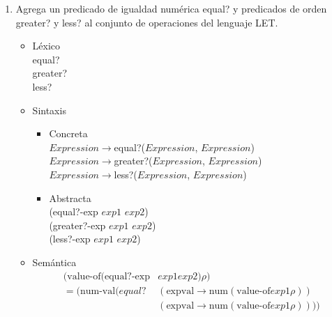 \documentclass{article}
\begin{document}
\begin{enumerate}
\begin{itemize}
        \begin{align*}
            (\text{value-of}(\text{mult-exp}& exp1 exp2) \rho ) \\
            =(\text{num-val} (* &(\text{expval} \to \text{num} (\text{value-of} exp1 \rho))\\
            &(\text{expval} \to \text{num} ( \text{value-of} exp1 \rho))))
        \end{align*}
        
        \begin{align*}
            (\text{value-of}(\text{div-exp}& exp1 exp2) \rho ) \\
            =(\text{num-val} (\text{floor}(/ &(\text{expval} \to \text{num} (\text{value-of} exp1 \rho))\\
            &(\text{expval} \to \text{num} ( \text{value-of} exp1 \rho)))))
        \end{align*}
    \end{itemize}
    \item Agrega un predicado de igualdad numérica equal? y predicados de orden greater? y less? al conjunto de operaciones del lenguaje LET.

    \begin{itemize}
        \item Léxico \\
        equal? \\
        greater? \\
        less? 
        \item Sintaxis 
        \begin{itemize}
            \item Concreta \\
            $Expression$$\to$equal?($Expression$, $Expression$) \\
            $Expression$$\to$greater?($Expression$, $Expression$) \\
            $Expression$$\to$less?($Expression$, $Expression$) 
            \item Abstracta \\
            (equal?-exp $exp1$ $exp2$) \\
            (greater?-exp $exp1$ $exp2$) \\
            (less?-exp $exp1$ $exp2$)
        \end{itemize}
        \item Semántica 
        \begin{align*}
            (\text{value-of}(\text{equal?-exp}& exp1 exp2) \rho ) \\
            =(\text{num-val} (equal? &(\text{expval} \to \text{num} (\text{value-of} exp1 \rho))\\
            &(\text{expval} \to \text{num} ( \text{value-of} exp1 \rho))))
        \end{align*}
        

\end{itemize}
\end{enumerate}
\end{document}
